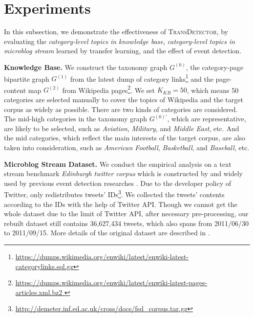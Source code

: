 \documentclass[runningheads,a4paper]{llncs}
\theoremstyle{exampstyle}
\begin{document}
\section{Experiments}
In this subsection, we demonstrate the effectiveness of \textsc{TransDetector}, by evaluating the \textit{category-level topics in knowledge base}, \textit{category-level topics in microblog stream} learned by transfer learning, and the effect of event detection. 

\textbf{Knowledge Base.} 
We construct the taxonomy graph \(G^{(0)}\), the category-page bipartite graph \(G^{(1)}\) from the latest dump of category links\footnote{\url{https://dumps.wikimedia.org/enwiki/latest/enwiki-latest-categorylinks.sql.gz}} and the page-content map \(G^{(2)}\) from Wikipedia pages\footnote{\url{https://dumps.wikimedia.org/enwiki/latest/enwiki-latest-pages-articles.xml.bz2 }}.
We set \(K_{KB}=50\), which means 50 categories are selected manually to cover the topics of Wikipedia and the target corpus as widely as possible. 
There are two kinds of categories are considered. 
The mid-high categories in the taxonomy graph \(G^{(0)'}\), which are representative, are likely to be selected, such as \textit{Aviation}, \textit{Military}, and \textit{Middle East}, etc.
And the mid categories, which reflect the main interests of the target corpus, are also taken into consideration, such as \textit{American Football}, \textit{Basketball}, and \textit{Baseball}, etc. 

\textbf{Microblog Stream Dataset.} We conduct the empirical analysis on a text stream benchmark \textit{Edinburgh twitter corpus} which is constructed by \cite{petrovic2012using} and widely used by previous event detection researches \cite{petrovic2013can} \cite{Wurzer:2015wq}. 
Due to the developer policy of Twitter, \cite{petrovic2012using} only redistributes tweets' IDs\footnote{\url{http://demeter.inf.ed.ac.uk/cross/docs/fsd_corpus.tar.gz}}.
We collected the tweets' contents according to the IDs with the help of Twitter API. 
Though we cannot get the whole dataset due to the limit of Twitter API, after necessary pre-processing, our rebuilt dataset still contains 36,627,434 tweets, which also spans from 2011/06/30 to 2011/09/15.
More details of the original dataset are described in \cite{petrovic2010edinburgh}.
\end{document}
